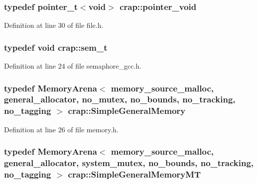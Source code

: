 \hypertarget{namespacecrap_aa4cb82451ede6b73c49d862af29aebb3}{
\subsubsection[{pointer\+\_\+void}]{\setlength{\rightskip}{0pt plus 5cm}typedef {\bf pointer\+\_\+t}$<$void$>$ {\bf crap\+::pointer\+\_\+void}}}\label{namespacecrap_aa4cb82451ede6b73c49d862af29aebb3}


Definition at line 30 of file file.\+h.

\hypertarget{namespacecrap_a8389bdde2ea5b1b5884c12d7f82c0e39}{
\subsubsection[{sem\+\_\+t}]{\setlength{\rightskip}{0pt plus 5cm}typedef void {\bf crap\+::sem\+\_\+t}}}\label{namespacecrap_a8389bdde2ea5b1b5884c12d7f82c0e39}


Definition at line 24 of file semaphore\+\_\+gcc.\+h.

\hypertarget{namespacecrap_a0f685df0fdfec9a4cbf9aaeab41a73a5}{
\subsubsection[{Simple\+General\+Memory}]{\setlength{\rightskip}{0pt plus 5cm}typedef {\bf Memory\+Arena}$<$ {\bf memory\+\_\+source\+\_\+malloc}, {\bf general\+\_\+allocator}, {\bf no\+\_\+mutex}, {\bf no\+\_\+bounds}, {\bf no\+\_\+tracking}, {\bf no\+\_\+tagging} $>$ {\bf crap\+::\+Simple\+General\+Memory}}}\label{namespacecrap_a0f685df0fdfec9a4cbf9aaeab41a73a5}


Definition at line 26 of file memory.\+h.

\hypertarget{namespacecrap_a8c3afedb9f5acb5aa0e4e2767ccf0118}{
\subsubsection[{Simple\+General\+Memory\+M\+T}]{\setlength{\rightskip}{0pt plus 5cm}typedef {\bf Memory\+Arena}$<$ {\bf memory\+\_\+source\+\_\+malloc}, {\bf general\+\_\+allocator}, {\bf system\+\_\+mutex}, {\bf no\+\_\+bounds}, {\bf no\+\_\+tracking}, {\bf no\+\_\+tagging} $>$ {\bf crap\+::\+Simple\+General\+Memory\+M\+T}}}\label{namespacecrap_a8c3afedb9f5acb5aa0e4e2767ccf0118}


